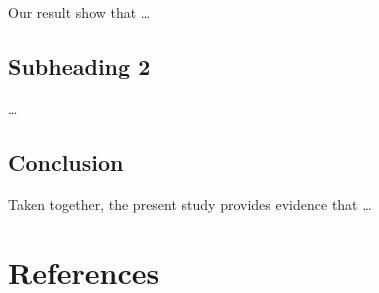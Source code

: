\documentclass[
  man]{apa6}
\begin{document}
Our result show that \ldots{}

\hypertarget{subheading-2}{%
\subsection{Subheading 2}\label{subheading-2}}

\ldots{}

\hypertarget{conclusion}{%
\subsection{Conclusion}\label{conclusion}}

Taken together, the present study provides evidence that \ldots{}

\newpage

\hypertarget{references}{%
\section{References}\label{references}}

\begingroup
\setlength{\parindent}{-0.5in}
\setlength{\leftskip}{0.5in}
\end{document}
